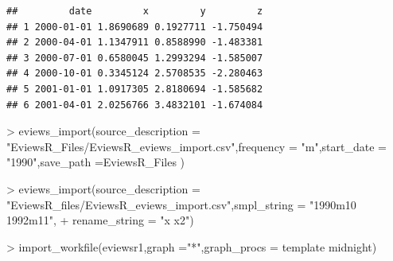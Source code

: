\documentclass[
]{article}
\newenvironment{Shaded}{\begin{snugshade}}{\end{snugshade}}
\newcommand{\AttributeTok}[1]{\textcolor[rgb]{0.77,0.63,0.00}{#1}}
\newcommand{\FunctionTok}[1]{\textcolor[rgb]{0.00,0.00,0.00}{#1}}
\newcommand{\NormalTok}[1]{#1}
\newcommand{\SpecialCharTok}[1]{\textcolor[rgb]{0.00,0.00,0.00}{#1}}
\newcommand{\StringTok}[1]{\textcolor[rgb]{0.31,0.60,0.02}{#1}}
\begin{document}
\begin{verbatim}
##         date         x         y         z
## 1 2000-01-01 1.8690689 0.1927711 -1.750494
## 2 2000-04-01 1.1347911 0.8588990 -1.483381
## 3 2000-07-01 0.6580045 1.2993294 -1.585007
## 4 2000-10-01 0.3345124 2.5708535 -2.280463
## 5 2001-01-01 1.0917305 2.8180694 -1.585682
## 6 2001-04-01 2.0256766 3.4832101 -1.674084
\end{verbatim}

\begin{Shaded}
\begin{Highlighting}[]
\SpecialCharTok{\textgreater{}} \FunctionTok{eviews\_import}\NormalTok{(}\AttributeTok{source\_description =} \StringTok{"EviewsR\_Files/EviewsR\_eviews\_import.csv"}\NormalTok{,}\AttributeTok{frequency =} \StringTok{"m"}\NormalTok{,}\AttributeTok{start\_date =} \StringTok{"1990"}\NormalTok{,}\AttributeTok{save\_path =}\StringTok{\textquotesingle{}EviewsR\_Files\textquotesingle{}}\NormalTok{ )}
\end{Highlighting}
\end{Shaded}

\begin{Shaded}
\begin{Highlighting}[]
\SpecialCharTok{\textgreater{}} \FunctionTok{eviews\_import}\NormalTok{(}\AttributeTok{source\_description =} \StringTok{"EviewsR\_files/EviewsR\_eviews\_import.csv"}\NormalTok{,}\AttributeTok{smpl\_string =} \StringTok{"1990m10 1992m11"}\NormalTok{,}
\SpecialCharTok{+} \AttributeTok{rename\_string =} \StringTok{"x x2"}\NormalTok{)}
\end{Highlighting}
\end{Shaded}

\begin{Shaded}
\begin{Highlighting}[]
\SpecialCharTok{\textgreater{}} \FunctionTok{import\_workfile}\NormalTok{(}\StringTok{\textquotesingle{}eviewsr1\textquotesingle{}}\NormalTok{,}\AttributeTok{graph =}\StringTok{"*"}\NormalTok{,}\AttributeTok{graph\_procs =} \StringTok{\textquotesingle{}template midnight\textquotesingle{}}\NormalTok{)}
\end{Highlighting}
\end{Shaded}
\end{document}

